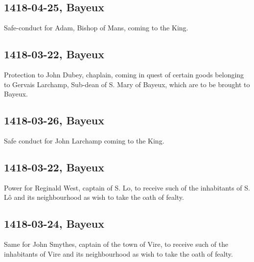 \documentclass[a4paper,12pt,twoside]{book}
\begin{document}
                
                \subsection{1418-04-25, Bayeux}
                
                
                     Safe-conduct for Adam, Bishop of Mans, coming to the King.
                  
                
                \subsection{1418-03-22, Bayeux}
                
                
                     Protection to John Dubey, chaplain, coming in quest of certain goods belonging to Gervais Larchamp, Sub-dean of S. Mary of Bayeux, which are to be brought to Bayeux.
                  
                
                \subsection{1418-03-26, Bayeux}
                
                
                     Safe conduct for John Larchamp coming to the King.
                  
                
                \subsection{1418-03-22, Bayeux}
                
                
                     Power for Reginald West, captain of S. Lo, to receive such of the inhabitants of S. Lô and its neighbourhood as wish to take the oath of fealty.
                  
                
                \subsection{1418-03-24, Bayeux}
                
                
                     Same for John Smythes, captain of the town of Vire, to receive such of the inhabitants of Vire and its neighbourhood as wish to take the oath of fealty.
                  
\end{document}
